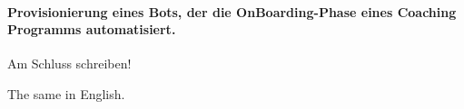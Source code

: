 \kurzfassung

\paragraph{Provisionierung eines Bots, der die OnBoarding-Phase eines Coaching Programms automatisiert.}

Am Schluss schreiben!

\kurzfassungEN

The same in English.
